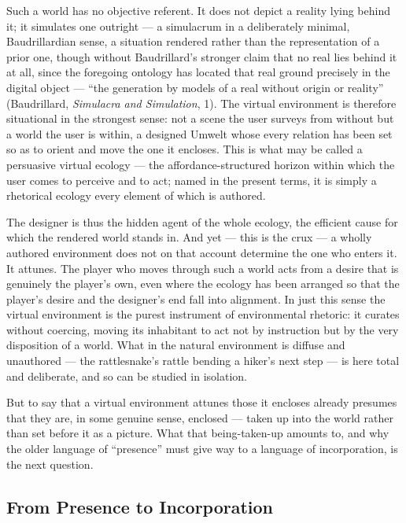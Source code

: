 \documentclass{article}
\begin{document}
Such a world has no objective referent. It does not depict a reality lying behind it; it simulates one outright — a simulacrum in a deliberately minimal, Baudrillardian sense, a situation rendered rather than the representation of a prior one, though without Baudrillard's stronger claim that no real lies behind it at all, since the foregoing ontology has located that real ground precisely in the digital object — ``the generation by models of a real without origin or reality'' (Baudrillard, \textit{Simulacra and Simulation}, 1). The virtual environment is therefore situational in the strongest sense: not a scene the user surveys from without but a world the user is within, a designed Umwelt whose every relation has been set so as to orient and move the one it encloses. This is what may be called a persuasive virtual ecology — the affordance-structured horizon within which the user comes to perceive and to act; named in the present terms, it is simply a rhetorical ecology every element of which is authored.

The designer is thus the hidden agent of the whole ecology, the efficient cause for which the rendered world stands in. And yet — this is the crux — a wholly authored environment does not on that account determine the one who enters it. It attunes. The player who moves through such a world acts from a desire that is genuinely the player's own, even where the ecology has been arranged so that the player's desire and the designer's end fall into alignment. In just this sense the virtual environment is the purest instrument of environmental rhetoric: it curates without coercing, moving its inhabitant to act not by instruction but by the very disposition of a world. What in the natural environment is diffuse and unauthored — the rattlesnake's rattle bending a hiker's next step — is here total and deliberate, and so can be studied in isolation.

But to say that a virtual environment attunes those it encloses already presumes that they are, in some genuine sense, enclosed — taken up into the world rather than set before it as a picture. What that being-taken-up amounts to, and why the older language of ``presence'' must give way to a language of incorporation, is the next question.

\bigskip

\subsection*{From Presence to Incorporation}
\end{document}
